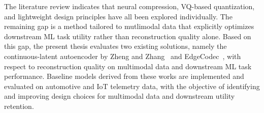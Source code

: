 The literature review indicates that neural compression, VQ-based quantization, and lightweight design principles have all been explored individually. The remaining gap is a method tailored to mutlimodal data that explicitly optimizes downstream ML task utility rather than reconstruction quality alone. Based on this gap, the present thesis evaluates two existing solutions, namely the continuous-latent autoencoder by Zheng and Zhang~\cite{Zheng2023} and EdgeCodec~\cite{Hodo2025}, with respect to reconstruction quality on multimodal data and downstream ML task performance. Baseline models derived from these works are implemented and evaluated on automotive and IoT telemetry data, with the objective of identifying and improving design choices for multimodal data and downstream utility retention.
